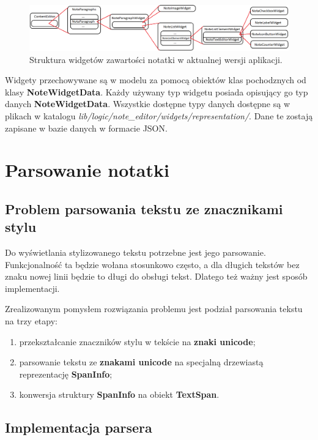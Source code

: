 \begin{figure}[ht]
    \centering
    \includegraphics[width=\linewidth]{images/struktura_widgetow_w_notatce.png}
    \caption{Struktura widgetów zawartości notatki w aktualnej wersji aplikacji.}
    \label{fig:struktura-widgetow}
\end{figure}

Widgety przechowywane są w modelu za pomocą obiektów klas pochodznych od klasy \textbf{NoteWidgetData}. Każdy używany typ widgetu posiada opisujący go typ danych \textbf{NoteWidgetData}. Wszystkie dostępne typy danych dostępne są w plikach w katalogu \textit{lib/logic/note\_{}editor/widgets/representation/}. Dane te zostają zapisane w bazie danych w formacie JSON.

\section{Parsowanie notatki}

\subsection{Problem parsowania tekstu ze znacznikami stylu}

Do wyświetlania stylizowanego tekstu potrzebne jest jego parsowanie. Funkcjonalność ta będzie wołana stosunkowo często, a dla długich tekstów bez znaku nowej linii będzie to długi do obsługi tekst. Dlatego też ważny jest sposób implementacji.

Zrealizowanym pomysłem rozwiązania problemu jest podział parsowania tekstu na trzy etapy:
\begin{enumerate}
    \setlength\itemsep{0mm}
    \item przekształcanie znaczników stylu w tekście na \textbf{znaki unicode};
    \item parsowanie tekstu ze \textbf{znakami unicode} na specjalną drzewiastą reprezentację \textbf{SpanInfo};
    \item konwersja struktury \textbf{SpanInfo} na obiekt \textbf{TextSpan}.
\end{enumerate}

\subsection{Implementacja parsera}

